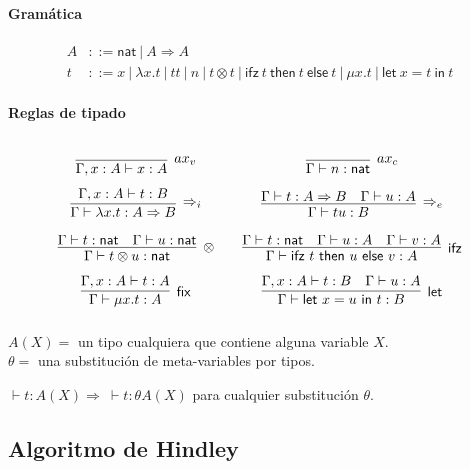 \documentclass[twoside,a4paper,12pt]{article}
\theoremstyle{definition}
\theoremstyle{remark}
\newcommand\fix[2]{\ensuremath{\mathsf{\mu}#1.#2}}
\newcommand\fun[2]{\ensuremath{\lambda {#1}{.}{#2}}}
\newcommand\ifz[3]{\ensuremath{\mathsf{ifz~}#1\mathsf{~then~}#2\mathsf{~else~}#3}}
\newcommand\letl[3]{\ensuremath{\mathsf{let~}#1=#2\mathsf{~in~}#3}}
\newcommand\nat{\ensuremath{\mathsf{nat}}}
\begin{document}
\paragraph{Gramática}
\begin{align*}
  A &::= \nat~|~A\Rightarrow A\\
  t &::= x~|~\fun xt~|~tt~|~n~|~t\otimes t~|~\ifz ttt~|~\fix xt~|~\letl xtt
\end{align*}

\paragraph{Reglas de tipado}
\[\arraycolsep=10pt\def\arraystretch{2.6}
  \begin{array}{cc}
    \infer[ax_v]{\Gamma,x:A\vdash x:A}{} &
    \infer[ax_c]{\Gamma\vdash n:\nat}{} \\
    \infer[\Rightarrow_i]
      {\Gamma\vdash\fun xt:A\Rightarrow B}
      {\Gamma,x:A\vdash t:B} &
    \infer[\Rightarrow_e]
      {\Gamma\vdash tu:B}
      {\Gamma\vdash t:A\Rightarrow B & \Gamma\vdash u:A} \\
    \infer[\otimes]
      {\Gamma\vdash t\otimes u:\nat}
      {\Gamma\vdash t:\nat & \Gamma\vdash u:\nat} &
    \infer[\mathsf{ifz}]
      {\Gamma\vdash\ifz tuv:A}
      {\Gamma\vdash t:\nat & \Gamma\vdash u:A & \Gamma\vdash v:A} \\
    \infer[\mathsf{fix}]
      {\Gamma\vdash\fix xt:A}
      {\Gamma,x:A\vdash t:A} &
    \infer[\mathsf{let}]
      {\Gamma\vdash\letl xut:B}
      {\Gamma,x:A\vdash t:B & \Gamma\vdash u:A}
  \end{array}
\]

\begin{definicion}{5.1}
  $A(X) = $ un tipo cualquiera que contiene alguna variable $X$. \\
  $\theta = $ una substitución de meta-variables por tipos.
\end{definicion}

\begin{teorema}{5.3}
  $\vdash t:A(X) \Rightarrow \ \vdash t:\theta A(X)$ para cualquier
  substitución $\theta$.
\end{teorema}

\clearpage
\subsection*{Algoritmo de Hindley}
\end{document}
